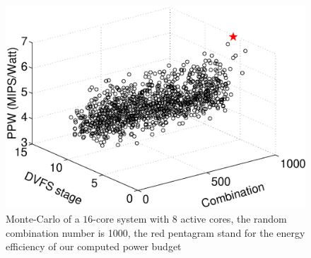 \begin{figure}
\centering
\includegraphics[width=1\linewidth]{fig/best_steady.eps}
\caption{Monte-Carlo of a $16$-core system with $8$ active cores, the random combination number is 1000, the red pentagram stand for the energy efficiency of our computed power budget}
\end{figure}

